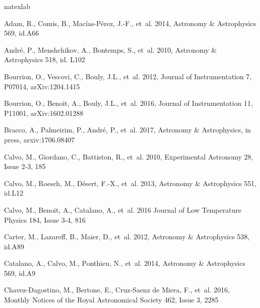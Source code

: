 \begin{thebibliography}{99}

\expandafter\ifx\csname natexlab\endcsname\relax\def\natexlab#1{#1}\fi

Adam, R., Comis, B., Mac\'ias-P\'erez, J.-F., {et~al.} 2014, 
Astronomy \& Astrophysics 569, id.A66


Andr\'e, P., Menshchikov, A., Bontemps, S., {et~al.} 2010, 
Astronomy \& Astrophysics 518, id. L102

Bourrion, O., Vescovi, C., Bouly, J.L., {et~al.} 2012, 
Journal of Instrumentation 7, P07014, arXiv:1204.1415

Bourrion, O., Benoit, A., Bouly, J.L., {et~al.} 2016, 
Journal of Instrumentation 11, P11001, arXiv:1602.01288

Bracco, A., Palmeirim, P., Andr\'e, P., {et~al.} 2017, 
Astronomy \& Astrophysics, in press, arxiv:1706.08407

Calvo, M., Giordano, C., Battiston, R., {et~al.} 2010, 
Experimental Astronomy 28, Issue 2-3, 185

Calvo, M., Roesch, M., D\'esert, F.-X., {et~al.} 2013, 
Astronomy \& Astrophysics 551, id.L12

Calvo, M., Benoit, A., Catalano, A., {et~al.} 2016
Journal of Low Temperature Physics 184, Issue 3-4, 816

Carter, M., Lazareff, B., Maier, D., {et~al.} 2012, 
Astronomy \& Astrophysics 538, id.A89

Catalano, A., Calvo, M., Ponthieu, N., {et~al.} 2014, 
Astronomy \& Astrophysics 569, id.A9

Chavez-Dagostino, M., Bertone, E., Cruz-Saenz de Miera, F., {et~al.} 2016, 
Monthly Notices of the Royal Astronomical Society 462, Issue 3, 2285


\end{thebibliography}
